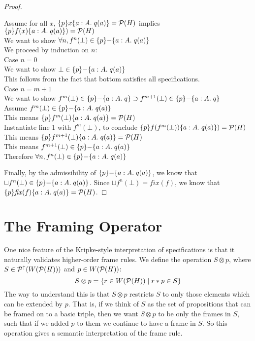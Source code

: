 \begin{proof}
\begin{tabbedproof}
\oo Assume for all $x$, $\{{p}\}{x}\{{a:A}.\;{q(a)}\} = \mathcal{P}(H)$ implies $\{{p}\}{f(x)}\{{a:A}.\;{q(a)}\}) = \mathcal{P}(H)$ \\
\ooo We want to show $\forall n, f^n(\bot) \in \{{p}\}{-}\{{a:A}.\;{q(a)}\}$ \\ 
\ooo We proceed by induction on $n$: \\
\oooo Case $n = 0$ \\
\ooooo We want to show $\bot \in \{{p}\}{-}\{{a:A}.\;{q(a)}\}$ \\
\ooooo This follows from the fact that bottom satisfies all specifications. \\
\oooo Case $n = m + 1$ \\
\ooooo We want to show $f^m(\bot) \in \{{p}\}{-}\{{a:A}.\;{q}\} \supset
                        f^{m+1}(\bot) \in \{{p}\}{-}\{{a:A}.\;{q}\}$ \\
\ooooo Assume $f^m(\bot) \in \{{p}\}{-}\{{a:A}.\;{q(a)}\}$ \\
\oooooo This means $\{{p}\}{f^m(\bot)}\{{a:A}.\;{q(a)}\} = \mathcal{P}(H)$ \\
\oooooo Instantiate line 1 with $f^m(\bot)$, to conclude
          $\{{p}\}{f(f^m(\bot))}\{{a:A}.\;{q(a)}\}) = \mathcal{P}(H)$ \\
\oooooo This means $\{{p}\}{f^{m+1}(\bot)}\{{a:A}.\;{q(a)}\} = \mathcal{P}(H)$ \\
\oooooo This means $f^{m+1}(\bot) \in \{{p}\}{-}\{{a:A}.\;{q(a)}\}$ \\
\ooo Therefore $\forall n, f^n(\bot) \in \{{p}\}{-}\{{a:A}.\;{q(a)}\}$ \\ 
\end{tabbedproof}
Finally, by the admissibility of $\{{p}\}{-}\{{a:A}.\;{q(a)}\}$, we know that
$\sqcup f^n(\bot) \in \{{p}\}{-}\{{a:A}.\;{q(a)}\}$. Since $\sqcup f^n(\bot) = fix(f)$, we 
know that $\{{p}\}{\mathit{fix}(f)}\{{a:A}.\;{q(a)}\} = \mathcal{P}(H)$. 
\end{proof}



\section{The Framing Operator}

One nice feature of the Kripke-style interpretation of specifications
is that it naturally validates higher-order frame rules.  We define
the operation $S \otimes p$, where $S \in \mathcal{P}^{\uparrow}({W(\mathcal{P}(H))})$ and
$p \in W(\mathcal{P}(H))$:
\begin{displaymath}
S \otimes p = \{{{ r \in W(\mathcal{P}(H)) }\;|\;{ r * p \in S }}\}
\end{displaymath}
%
The way to understand this is that $S \otimes p$ restricts $S$ to only those
elements which can be extended by $p$. That is, if we think of $S$ as the
set of propositions that can be framed on to a basic triple, then we want
$S \otimes p$ to be only the frames in $S$, such that if we added $p$ to
them we continue to have a frame in $S$. So this operation gives a semantic
interpretation of the frame rule. 

